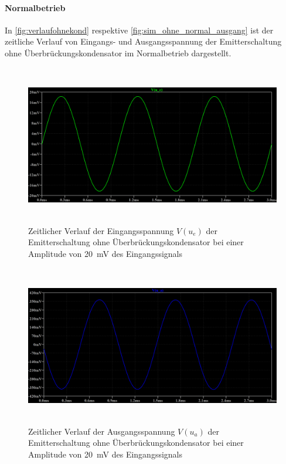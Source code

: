 \documentclass[12pt,english,ngerman]{scrartcl}
\begin{document}
\paragraph{Normalbetrieb}

In \autoref{fig:verlaufohnekond} respektive \autoref{fig:sim_ohne_normal_ausgang} ist der zeitliche Verlauf von Eingangs-
und Ausgangsspannung der Emitterschaltung ohne Überbrückungskondensator im Normalbetrieb
dargestellt.

\begin{figure}[H]
    \centering
    \includegraphics[width=\linewidth, height=7cm]{./figures/ohnekond/eingangssignal20mv.png}
    \caption{Zeitlicher Verlauf der Eingangsspannung $V(u_e)$ 
    der Emitterschaltung ohne Überbrückungskondensator bei einer Amplitude von
  \SI{20}{mV} des Eingangssignals}
    \label{fig:verlaufohnekond}
\end{figure}

\begin{figure}[H]
    \centering
    \includegraphics[width=\linewidth, height=7cm]{./figures/ohnekond/ausgangssignal20mv.png}
    \caption{Zeitlicher Verlauf der Ausgangsspannung $V(u_a)$
    der Emitterschaltung ohne Überbrückungskondensator bei einer Amplitude von
  \SI{20}{mV} des Eingangssignals}
    \label{fig:sim_ohne_normal_ausgang}
\end{figure}
\end{document}
